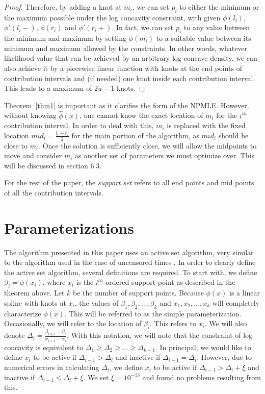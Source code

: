 \begin{proof}
	Therefore, by adding a knot at $m_i$, we can set $p_i$ to either the minimum or the maximum possible under the log concavity constraint, with given $\phi(l_i)$, $\phi'(l_i -)$, $\phi(r_i)$ and $\phi'(r_i+)$. In fact, we can set $p_i$ to any value between the minimum and maximum by setting $\phi(m_i)$ to a suitable value between its minimum and maximum allowed by the constraints.  In other words, whatever likelihood value that can be achieved by an arbitrary log-concave density, we can also achieve it by a piecewise linear function with knots at the end points of contribution intervals and (if needed) one knot inside each contribution interval. This leads to a maximum of $2u-1$ knots.
	\end{proof}
	
	Theorem~\ref{thm1} is important as it clarifies the form of the NPMLE.  However, without knowing $\hat\phi(x)$, one cannot know the exact location of $m_i$ for the $i^{th}$ contribution interval. In order to deal with this, $m_i$ is replaced with the fixed location $mid_i = \frac{l_i + r_i}{2}$ for the main portion of the algorithm, as $mid_i$ should be close to $m_i$. Once the solution is sufficiently close, we will allow the midpoints to move and consider $m_i$ as another set of parameters we must optimize over. This will be discussed in section 6.3. 
		
	For the rest of the paper, the {\it support set} refers to all end points and mid points of all the contribution intervals.



	{\section{Parameterizations} }
	\label{sec:3}

	The algorithm presented in this paper uses an active set algorithm, very similar to the algorithm used in the case of uncensored times \cite{RefRuf2007}. In order to clearly define the active set algorithm, several definitions are required. To start with, we define $\beta_i = \phi(x_i)$, where $x_i$ is the $i^{th}$ ordered support point as described in the theorem above. Let $k$ be the number of support points. Because $\phi(x)$ is a linear spline with knots at $x_i$, the values of $\beta_1, \beta_2, ..., \beta_k$ and $x_1, x_2,..., x_k$ will completely characterize $\phi(x)$. This will be referred to as the simple parameterization. Occasionally, we will refer to the location of $\beta_i$. This refers to $x_i$. We will also denote $\Delta_i = \frac{\beta_{i+1} - \beta_i} {x_{i+1} - x_i}$. With this notation, we will note that the constraint of log concavity is equivalent to $\Delta_1 \geq \Delta_2 \geq ... \geq \Delta_{k-1}$. In principal, we would like to define $x_i$ to be active if $\Delta_{i-1} > \Delta_i$ and inactive if $\Delta_{i-1} = \Delta_i$. However, due to numerical errors in calculating $\Delta_i$, we define $x_i$ to be active if $\Delta_{i-1} > \Delta_i + \xi$ and inactive if $\Delta_{i-1} \leq \Delta_i + \xi$.  We set $\xi = 10^{-13}$ and found no problems resulting from this. 
	
